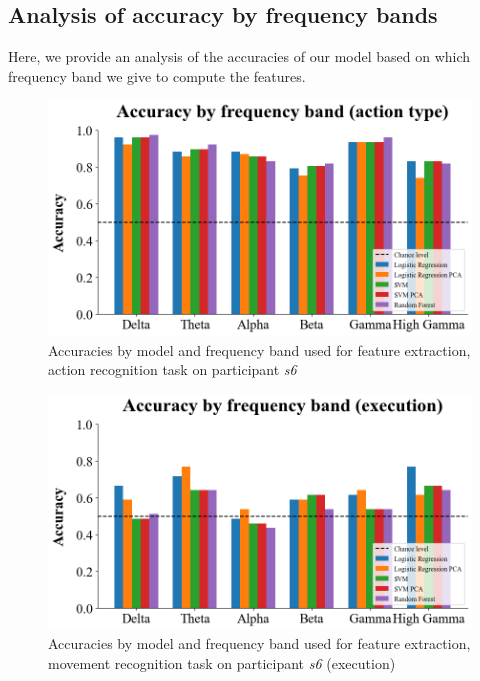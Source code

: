 \documentclass[10pt,conference,compsocconf]{IEEEtran}
\begin{document}
\subsection{Analysis of accuracy by frequency bands}
Here, we provide an analysis of the accuracies of our model based on which frequency band we give to compute the features.

\begin{figure}[h!]
    \center
    \includegraphics[width=\linewidth]{../Code/figures/s6_accuracies_ExObs_freq_bands.png}
    \caption{Accuracies by model and frequency band used for feature extraction, action recognition task on participant \textit{s6}}
    \label{appfig:accuracies_ExObs_freq_bands_freqs}
\end{figure}
\FloatBarrier

\begin{figure}[h!]
    \center
    \includegraphics[width=\linewidth]{../Code/figures/s6_accuracies_ex_freq_bands.png}
    \caption{Accuracies by model and frequency band used for feature extraction, movement recognition task on participant \textit{s6} (execution)}
    \label{appfig:accuracies_ex_freq_bands}
\end{figure}
\FloatBarrier
\end{document}
